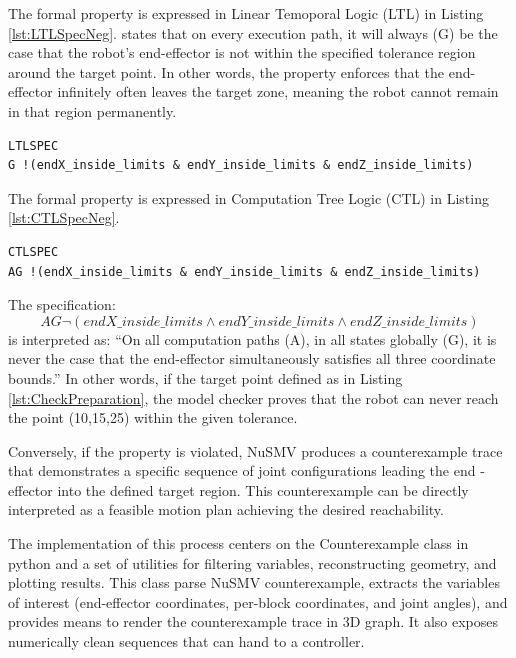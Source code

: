 The formal property is expressed in Linear Temoporal Logic (LTL) in Listing \ref{lst:LTLSpecNeg}.
states that on every execution path, it will always (G) be 
the case that the robot’s end-effector is not within the specified tolerance region around 
the target point. In other words, the property enforces that the end-effector infinitely often 
leaves the target zone, meaning the robot cannot remain in that region permanently.

\begin{lstlisting}[language=NuSMV, caption={Reachability condition in LTL specification}, 
    label={lst:LTLSpecNeg}]
LTLSPEC 
G !(endX_inside_limits & endY_inside_limits & endZ_inside_limits)
\end{lstlisting}


The formal property is expressed in Computation Tree Logic (CTL) in Listing \ref{lst:CTLSpecNeg}.

\begin{lstlisting}[language=NuSMV, 
    caption={Reachability condition in CTL specification}, 
    label={lst:CTLSpecNeg}]
CTLSPEC 
AG !(endX_inside_limits & endY_inside_limits & endZ_inside_limits)
\end{lstlisting}

The specification:
\[
AG \neg ( endX\_inside\_limits \land endY\_inside\_limits \land endZ\_inside\_limits)
\]
is interpreted as: “On all computation paths (A), in all states globally 
(G), it is never the case that 
the end-effector simultaneously satisfies all three coordinate 
bounds.” In other words, if the  target point defined as in  Listing \ref{lst:CheckPreparation},
the model checker proves that the robot can never reach the point
(10,15,25) within the given tolerance.

Conversely, if the property is violated, NuSMV produces a counterexample trace that demonstrates 
a specific sequence of joint configurations leading the end
-effector into the defined target region. This 
counterexample can be directly interpreted as a feasible motion 
plan achieving the desired reachability.

The implementation  of this process centers on the Counterexample class in python
and a set of utilities for filtering variables, reconstructing geometry, 
and plotting results. This class  parse NuSMV counterexample, 
extracts the variables of interest (end-effector coordinates,
per-block coordinates, and joint angles), and provides means to render the 
counterexample trace in 3D graph. It also exposes numerically clean sequences that can 
hand to a controller. 

